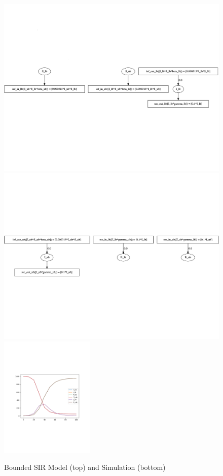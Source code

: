 \begin{figure}[t]
    \centering
    \includegraphics[width=0.8\linewidth,clip,trim={0 8cm 0 8cm}]{fig/sir/sir_bounded_model_1.pdf}
    \includegraphics[width=0.8\linewidth,clip]{fig/sir/sir_bounded_model_2.pdf}
    \includegraphics[width=0.4\textwidth,clip]{fig/sir/sir_bounded_sim.pdf}
    \caption{\label{fig:sir_bounded} Bounded SIR Model (top) and Simulation (bottom)}
\end{figure}

